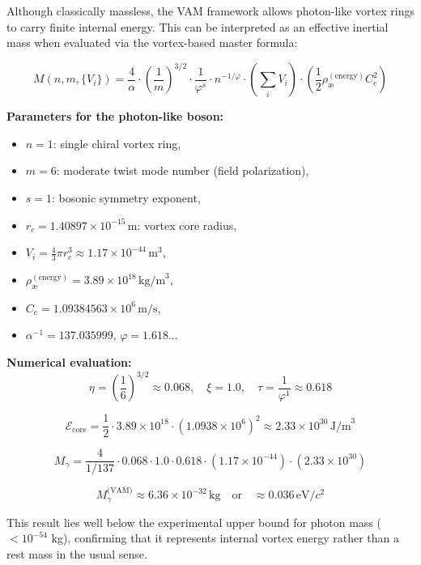 Although classically massless, the VAM framework allows photon-like vortex rings to carry finite internal energy. This can be interpreted as an effective inertial mass when evaluated via the vortex-based master formula:

\begin{equation}
\boxed{
M(n, m, \{V_i\}) = \frac{4}{\alpha} \cdot \left( \frac{1}{m} \right)^{3/2} \cdot \frac{1}{\varphi^s} \cdot n^{-1/\varphi} \cdot \left( \sum_i V_i \right) \cdot \left( \frac{1}{2} \rho_{\text{\ae}}^{(\text{energy})} C_e^2 \right)
}
\end{equation}

\noindent
\textbf{Parameters for the photon-like boson:}
\begin{itemize}
    \item \(n = 1\): single chiral vortex ring,
    \item \(m = 6\): moderate twist mode number (field polarization),
    \item \(s = 1\): bosonic symmetry exponent,
    \item \(r_c = 1.40897 \times 10^{-15} \, \text{m}\): vortex core radius,
    \item \(V_i = \frac{4}{3} \pi r_c^3 \approx 1.17 \times 10^{-44} \, \text{m}^3\),
    \item \(\rho_\text{\ae}^{(\text{energy})} = 3.89 \times 10^{18} \, \text{kg/m}^3\),
    \item \(C_e = 1.09384563 \times 10^6 \, \text{m/s}\),
    \item \(\alpha^{-1} = 137.035999\), \quad \(\varphi = 1.618...\)
\end{itemize}

\noindent
\textbf{Numerical evaluation:}
\[
\eta = \left( \frac{1}{6} \right)^{3/2} \approx 0.068,
\quad
\xi = 1.0,
\quad
\tau = \frac{1}{\varphi^1} \approx 0.618
\]

\[
\mathcal{E}_\text{core} = \frac{1}{2} \cdot 3.89 \times 10^{18} \cdot (1.0938 \times 10^6)^2 \approx 2.33 \times 10^{30} \, \text{J/m}^3
\]

\[
M_\gamma = \frac{4}{1/137} \cdot 0.068 \cdot 1.0 \cdot 0.618 \cdot (1.17 \times 10^{-44}) \cdot (2.33 \times 10^{30})
\]

\[
\boxed{
M_\gamma^\text{(VAM)} \approx 6.36 \times 10^{-32} \, \text{kg}
}
\quad \text{or} \quad
\boxed{
\approx 0.036 \, \text{eV}/c^2
}
\]

This result lies well below the experimental upper bound for photon mass (\(< 10^{-54}\) kg), confirming that it represents internal vortex energy rather than a rest mass in the usual sense.

